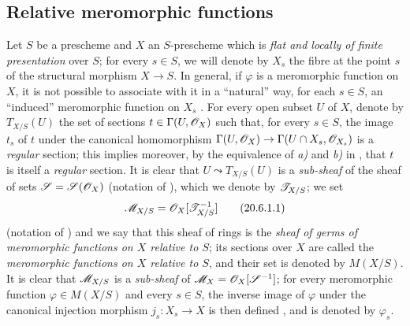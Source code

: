 
\subsection{Relative meromorphic functions}

\begin{env}[20.6.1]\label{IV.20.6.1}
Let $S$ be a prescheme and $X$ an $S$-prescheme which is \emph{flat and locally of finite presentation} over $S$; for every $s\in S$, we will denote by $X_s$ the fibre at the point $s$ of the structural morphism $X\to S$.
In general, if $\varphi$ is a meromorphic function on $X$, it is not possible to associate with it in a ``natural'' way, for each $s\in S$, an ``induced'' meromorphic function on $X_s$ .
For every open subset $U$ of $X$, denote by $T_{X/S}(U)$ the set of sections $t\in\Gamma(U,\mathscr{O}_X)$ such that, for every $s\in S$, the image $t_s$ of $t$ under the canonical homomorphism $\Gamma(U,\mathscr{O}_X)\to\Gamma(U\cap X_s,\mathscr{O}_{X_s})$ is a \emph{regular} section; this implies moreover, by the equivalence of \emph{a)} and \emph{b)} in , that $t$ is itself a \emph{regular} section.
It is clear that $U\leadsto T_{X/S}(U)$ is a \emph{sub-sheaf} of the sheaf of sets $\mathscr{S}=\mathscr{S}(\mathscr{O}_X)$ (notation of ), which we denote by $\mathscr{T}_{X/S}$; we set
\[
\label{IV.20.6.1.1}
  \mathscr{M}_{X/S}=\mathscr{O}_X[\mathscr{T}_{X/S}^{-1}]
  \tag{20.6.1.1}
\]
(notation of ) and we say that this sheaf of rings is the \emph{sheaf of germs of meromorphic functions on $X$ relative to $S$}; its sections over $X$ are called the \emph{meromorphic functions on $X$ relative to $S$}, and their set is denoted by $M(X/S)$.
It is clear that $\mathscr{M}_{X/S}$ is a \emph{sub-sheaf} of $\mathscr{M}_X=\mathscr{O}_X[\mathscr{S}^{-1}]$; for every meromorphic function $\varphi\in M(X/S)$ and every $s\in S$, the inverse image of $\varphi$ under the canonical injection morphism $j_s:X_s\to X$ is then defined , and is denoted by $\varphi_s$.
\end{env}

